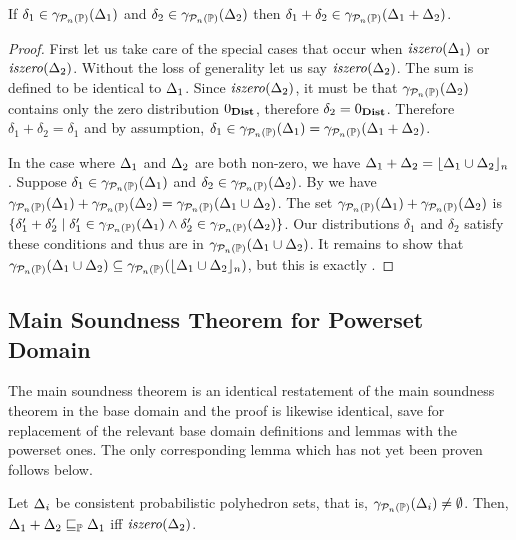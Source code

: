 \begin{lemma}
\label{lem:ppp:plus}
 If $ \delta_1 \in \gamma_{\mathcal{P}_{n}\left( \mathbb{P} \right)}(\Delta_{1}) $ and $ \delta_2
  \in \gamma_{\mathcal{P}_{n}\left( \mathbb{P} \right)}(\Delta_{2}) $ then $ \delta_1 + \delta_2 \in
  \gamma_{\mathcal{P}_{n}\left( \mathbb{P} \right)}(\Delta_{1} + \Delta_{2}) $.
\end{lemma}
\begin{proof} First let us take care of the special cases that occur
  when $ \mathit{iszero}(\Delta_{1}) $ or $ \mathit{iszero}(\Delta_{2}) $. Without the loss
  of generality let us say $ \mathit{iszero}(\Delta_{2}) $. The sum is defined to
  be identical to $ \Delta_{1} $. Since $ \mathit{iszero}(\Delta_{2}) $, it must be
  that $ \gamma_{\mathcal{P}_{n}\left( \mathbb{P} \right)}(\Delta_{2}) $ contains only the zero distribution
  $ 0_{\textbf{Dist}} $, therefore $ \delta_2 = 0_{\textbf{Dist}} $. Therefore
  $ \delta_1 + \delta_2 = \delta_1 $ and by assumption,
  $ \delta_1 \in \gamma_{\mathcal{P}_{n}\left( \mathbb{P} \right)}(\Delta_{1}) = \gamma_{\mathcal{P}_{n}\left( \mathbb{P} \right)}(\Delta_{1} + \Delta_{2}) $.

In the case where $\Delta_{1}$ and $\Delta_{2}$ are both non-zero, we have
$\Delta_{1} + \Delta_{2} = \lfloor \Delta_{1} \cup \Delta_{2} \rfloor_{n}$.
Suppose $\delta_1 \in \gamma_{\mathcal{P}_{n}\left( \mathbb{P} \right)}(\Delta_{1})$ and $\delta_2 \in \gamma_{\mathcal{P}_{n}\left( \mathbb{P} \right)}(\Delta_{2})$.
By  we have
$\gamma_{\mathcal{P}_{n}\left( \mathbb{P} \right)}(\Delta_{1}) + \gamma_{\mathcal{P}_{n}\left( \mathbb{P} \right)}(\Delta_{2}) = \gamma_{\mathcal{P}_{n}\left( \mathbb{P} \right)}(\Delta_{1} \cup \Delta_{2})$.
The set $\gamma_{\mathcal{P}_{n}\left( \mathbb{P} \right)}(\Delta_{1}) + \gamma_{\mathcal{P}_{n}\left( \mathbb{P} \right)}(\Delta_{2})$ is
$\{\delta_1' + \delta_2' \mid \delta_1' \in \gamma_{\mathcal{P}_{n}\left( \mathbb{P} \right)}(\Delta_{1}) \wedge \delta_2' \in \gamma_{\mathcal{P}_{n}\left( \mathbb{P} \right)}(\Delta_{2}) \}$.
Our distributions $\delta_1$ and $\delta_2$ satisfy these conditions and thus
are in $\gamma_{\mathcal{P}_{n}\left( \mathbb{P} \right)}(\Delta_{1} \cup \Delta_{2})$.  It remains to show that
$\gamma_{\mathcal{P}_{n}\left( \mathbb{P} \right)}(\Delta_{1} \cup \Delta_{2}) \subseteq \gamma_{\mathcal{P}_{n}\left( \mathbb{P} \right)}(\lfloor \Delta_{1} \cup \Delta_{2} \rfloor_{n})$,
but this is exactly .
\end{proof}

\subsection{Main Soundness Theorem for Powerset Domain}

The main soundness theorem is an identical restatement of the main
soundness theorem in the base domain and the proof is likewise
identical, save for replacement of the relevant base domain definitions
and lemmas with the powerset ones. The only corresponding lemma which
has not yet been proven follows below.

\begin{lemma}\label{lem:ppp:while:order} Let $ \Delta_{i} $ be consistent
probabilistic polyhedron sets, that is, $ \gamma_{\mathcal{P}_{n}\left( \mathbb{P} \right)}(\Delta_{i}) \neq \emptyset $.
\label{lem:pps:while:order:pluszero} Then, $ \Delta_{1} + \Delta_{2} \sqsubseteq_{\mathbb{P}} \Delta_{1} $ iff $ \mathit{iszero}(\Delta_{2}) $.
\end{lemma}

